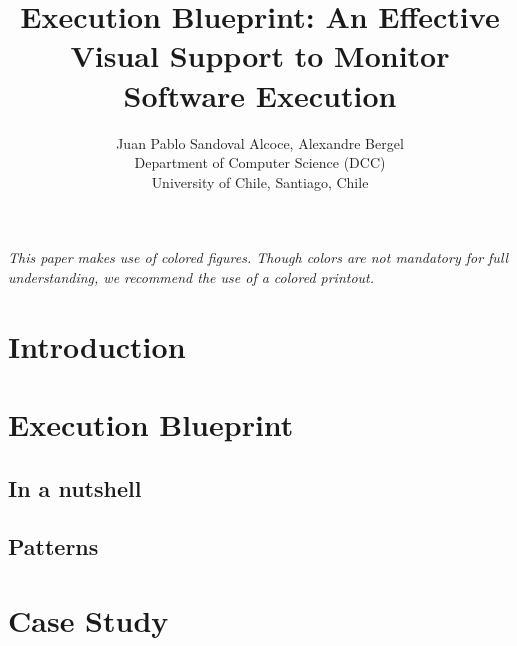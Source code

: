 \documentclass{sig-alternate}
\newcommand{\Title}{Execution Blueprint: An Effective Visual Support to Monitor Software Execution}
\newcommand{\TitleShort}{\Title}
\newcommand{\Authors}{Juan Pablo Sandoval Alcoce, Alexandre Bergel}
\newcommand{\AuthorsShort}{J.P. Sandoval Alcose, A. Bergel}
\newcommand{\seclabel}[1]{\label{sec:#1}}
\begin{document}
\title{\Title}

\author{\Authors\\[3mm]
Department of Computer Science (DCC)\\ University of Chile, Santiago, Chile\\[1 ex]
} 

\maketitle

\emph{This paper makes use of colored figures. Though colors are not mandatory for full understanding, we recommend  the use of a colored printout.}

\begin{abstract}



\end{abstract}


\section{Introduction}\seclabel{introduction}

\section{Execution Blueprint}\seclabel{executionBlueprint}

\subsection{In a nutshell}

\subsection{Patterns}

\section{Case Study}\seclabel{case study}
\end{document}
